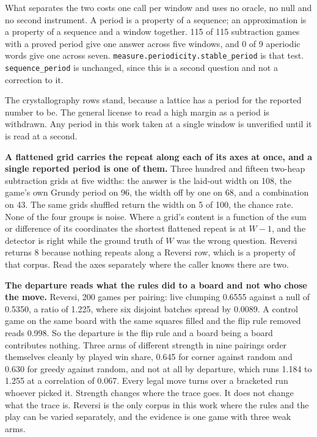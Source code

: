 What separates the two costs one call per window and uses no oracle, no null and no second instrument. A period is a property of a sequence; an approximation is a property of a sequence and a window together. 115 of 115 subtraction games with a proved period give one answer across five windows, and 0 of 9 aperiodic words give one across seven. \texttt{measure.\allowbreak{}periodicity.\allowbreak{}stable\_\allowbreak{}period} is that test. \texttt{sequence\_period} is unchanged, since this is a second question and not a correction to it.

The crystallography rows stand, because a lattice has a period for the reported number to be. The general license to read a high margin as a period is withdrawn. Any period in this work taken at a single window is unverified until it is read at a second.

\textbf{A flattened grid carries the repeat along each of its axes at once, and a single reported period is one of them.} Three hundred and fifteen two-heap subtraction grids at five widths: the answer is the laid-out width on 108, the game's own Grundy period on 96, the width off by one on 68, and a combination on 43. The same grids shuffled return the width on 5 of 100, the chance rate. None of the four groups is noise. Where a grid's content is a function of the sum or difference of its coordinates the shortest flattened repeat is at \(W-1\), and the detector is right while the ground truth of \(W\) was the wrong question. Reversi returns 8 because nothing repeats along a Reversi row, which is a property of that corpus. Read the axes separately where the caller knows there are two.

\textbf{The departure reads what the rules did to a board and not who chose the move.} Reversi, 200 games per pairing: live clumping 0.6555 against a null of 0.5350, a ratio of 1.225, where six disjoint batches spread by 0.0089. A control game on the same board with the same squares filled and the flip rule removed reads 0.998. So the departure is the flip rule and a board being a board contributes nothing. Three arms of different strength in nine pairings order themselves cleanly by played win share, 0.645 for corner against random and 0.630 for greedy against random, and not at all by departure, which runs 1.184 to 1.255 at a correlation of 0.067. Every legal move turns over a bracketed run whoever picked it. Strength changes where the trace goes. It does not change what the trace is. Reversi is the only corpus in this work where the rules and the play can be varied separately, and the evidence is one game with three weak arms.

